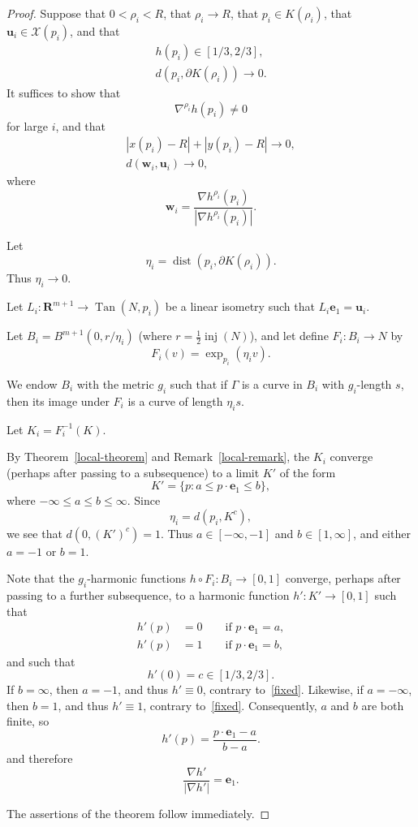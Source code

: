 \documentclass{amsart}
\newcommand{\inj}{\operatorname{inj}}    %
\newcommand{\RR}{\mathbf{R}}  %
\newcommand{\dist}{\operatorname{dist}}
\newcommand{\Tan}{\operatorname{Tan}}
\newcommand{\Xx}{\mathcal{X}}
\newcommand{\ww}{\mathbf w}
\newcommand{\ee}{\mathbf e}
\newcommand{\uu}{\mathbf{u}}
\theoremstyle{definition}
\theoremstyle{definition}
\begin{document}
\begin{proof}
Suppose that $0<\rho_i<R$, that $\rho_i\to R$,
that
 $p_i \in K(\rho_i)$, that $\uu_i\in \Xx(p_i)$, 
 and that 
\begin{gather*}
h(p_i)\in [1/3, 2/3], \\
d(p_i,\partial K(\rho_i)) \to  0.
\end{gather*}
It suffices to show that 
\[
\nabla^{\rho_i}h(p_i)\ne 0
\]
 for large $i$,
and that
\begin{gather*}
|x(p_i)-R| + |y(p_i) - R| \to 0, \\
d(\ww_i, \uu_i) \to 0,
\end{gather*}
where
\[
  \ww _i = \frac{\nabla h^{\rho_i}(p_i)}{|\nabla h^{\rho_i}(p_i)|}.
\]

Let
\[
   \eta_i = \dist(p_i, \partial K(\rho_i)).
\]
Thus 
$
 \eta_i \to 0.
$

Let $L_i:\RR^{m+1} \to \Tan(N,p_i)$ be a linear isometry
such that $L_i\ee_1=\uu_i$.

Let $B_i= B^{m+1}(0, r/\eta_i)$ (where $r=\frac12\inj(N)$),
and let
define $F_i:B_i\to N$ by
\[
F_i(v) = \exp_{p_i}(\eta_i v).
\]


We endow $B_i$ with the metric $g_i$ such that if $\Gamma$ is a curve in $B_i$ with $g_i$-length $s$,
then its image under $F_i$ is a curve of length $\eta_i s$.

Let $K_i= F_i^{-1}(K)$.

By Theorem~\ref{local-theorem} and Remark~\ref{local-remark},
 the $K_i$ converge (perhaps after passing to a subsequence) to a limit $K'$
of the form
\[
  K' = \{p:  a\le p\cdot\ee_1 \le b\},
\]
where $-\infty\le a\le b \le \infty$.
Since
\[
    \eta_i = d(p_i,K^c),
\]
we see that $d(0,(K')^c)=1$.   Thus $a\in [-\infty, -1]$ and $b\in [1,\infty]$,
and either $a=-1$ or $b=1$.

Note that the $g_i$-harmonic functions $h\circ F_i: B_i\to [0,1]$
converge, perhaps after passing to a further subsequence, to a harmonic
function $h': K' \to [0,1]$ such that
\begin{align*}
h'(p) &= 0  \qquad\text{if $p\cdot \ee_1=a$}, \\
h'(p) &=1   \qquad\text{if $p\cdot \ee_1=b$},
\end{align*}
and such that
\begin{equation}\label{fixed}
  h'(0)=c\in [1/3,2/3].
\end{equation}
If $b=\infty$, then $a=-1$, and thus $h'\equiv 0$,  contrary to~\eqref{fixed}.
Likewise, if $a=-\infty$, then $b=1$, and thus $h'\equiv 1$, contrary to~\eqref{fixed}.
Consequently, $a$ and $b$ are both finite, so
\[
  h'(p) = \frac{p\cdot\ee_1 - a}{b-a}.
\]
and therefore
\[
   \frac{\nabla h'}{|\nabla h'|} = \ee_1.
\]


The assertions of the theorem follow immediately.
\end{proof}
\end{document}
